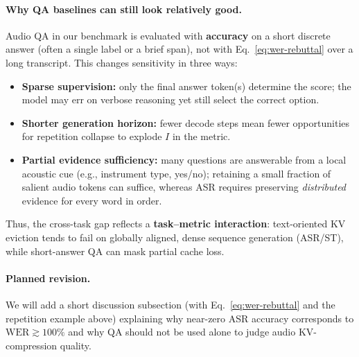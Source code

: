 \begin{answer}
\paragraph{Why QA baselines can still look relatively good.}
Audio QA in our benchmark is evaluated with \textbf{accuracy} on a short discrete answer (often a single label or a brief span), not with Eq.~\eqref{eq:wer-rebuttal} over a long transcript.
This changes sensitivity in three ways:
\begin{itemize}
    \item \textbf{Sparse supervision:} only the final answer token(s) determine the score; the model may err on verbose reasoning yet still select the correct option.
    \item \textbf{Shorter generation horizon:} fewer decode steps mean fewer opportunities for repetition collapse to explode $I$ in the metric.
    \item \textbf{Partial evidence sufficiency:} many questions are answerable from a local acoustic cue (e.g., instrument type, yes/no); retaining a small fraction of salient audio tokens can suffice, whereas ASR requires preserving \emph{distributed} evidence for every word in order.
\end{itemize}
Thus, the cross-task gap reflects a \textbf{task--metric interaction}: text-oriented KV eviction tends to fail on globally aligned, dense sequence generation (ASR/ST), while short-answer QA can mask partial cache loss.

\paragraph{Planned revision.}
We will add a short discussion subsection (with Eq.~\eqref{eq:wer-rebuttal} and the repetition example above) explaining why near-zero ASR accuracy corresponds to $\mathrm{WER}\gtrsim 100\%$ and why QA should not be used alone to judge audio KV-compression quality.
\end{answer}
